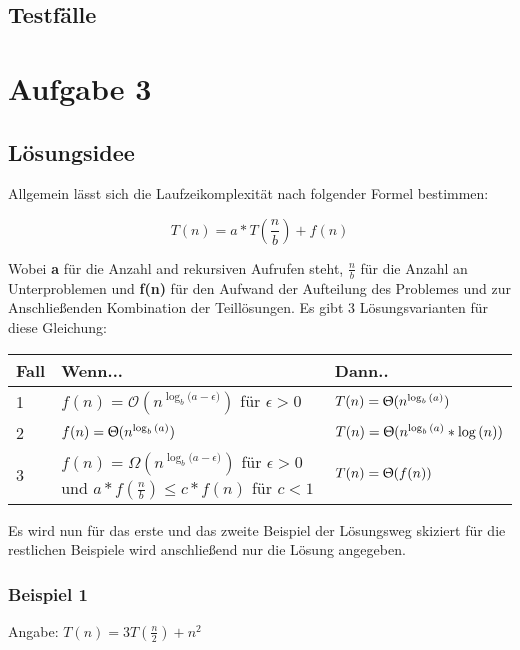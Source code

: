 \documentclass[a4paper,oneside,openany]{tufte-book}
\begin{document}
\section{Testf\"{a}lle}
\begin{fullwidth}

\end{fullwidth}
\chapter{Aufgabe 3}

\section{L\"{o}sungsidee}

Allgemein lässt sich die Laufzeikomplexität nach folgender Formel bestimmen:

\[
T(n) = a * T(\frac{n}{b}) + f(n)
\]

Wobei \textbf{a} für die Anzahl and rekursiven Aufrufen steht, $\frac{n}{b}$ für die Anzahl an Unterproblemen und
\textbf{f(n)} für den Aufwand der Aufteilung des Problemes und zur Anschließenden Kombination der Teillösungen.
Es gibt 3 Lösungsvarianten für diese Gleichung:

\begin{tabular}{l | p{5cm} | l}
Fall & Wenn... & Dann.. \\
\hline
1 & $ f(n) = \mathcal{O}(n ^{\log_b{(a-\epsilon})}) $ für $ \epsilon > 0 $ & $ T(n) = \Uptheta(n^{\log_b{(a)}}) $\\
\hline
2 & $ f(n) = \Uptheta(n^{\log_b{(a)}}) $ & $ T(n) = \Uptheta(n^{\log_b{(a)}} * \log{(n)}) $ \\
\hline
3 & $ f(n) = \Omega(n ^{\log_b{(a-\epsilon})}) $ für $ \epsilon > 0 $ %
und \newline
$ a*f(\frac{n}{b}) \leq c*f(n) $ für $ c < 1 $
& $ T(n) = \Uptheta(f(n)) $ \\ %
\end{tabular}

Es wird nun für das erste und das zweite Beispiel der Lösungsweg skiziert für die restlichen Beispiele wird anschließend nur die Lösung angegeben.

\subsection{Beispiel 1}

Angabe: $ T(n) = 3T(\frac{n}{2}) + n^2 $
\end{document}
